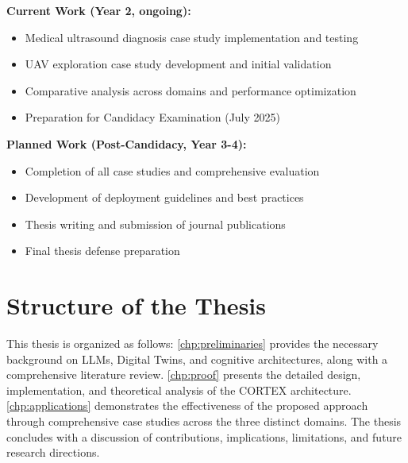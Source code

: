 \textbf{Current Work (Year 2, ongoing):}
\begin{itemize}
    \item Medical ultrasound diagnosis case study implementation and testing
    \item UAV exploration case study development and initial validation
    \item Comparative analysis across domains and performance optimization
    \item Preparation for Candidacy Examination (July 2025)
\end{itemize}

\textbf{Planned Work (Post-Candidacy, Year 3-4):}
\begin{itemize}
    \item Completion of all case studies and comprehensive evaluation
    \item Development of deployment guidelines and best practices
    \item Thesis writing and submission of journal publications
    \item Final thesis defense preparation
\end{itemize}

\section{Structure of the Thesis}

This thesis is organized as follows: \autoref{chp:preliminaries} provides the necessary background on LLMs, Digital Twins, and cognitive architectures, along with a comprehensive literature review. \autoref{chp:proof} presents the detailed design, implementation, and theoretical analysis of the CORTEX architecture. \autoref{chp:applications} demonstrates the effectiveness of the proposed approach through comprehensive case studies across the three distinct domains. The thesis concludes with a discussion of contributions, implications, limitations, and future research directions.